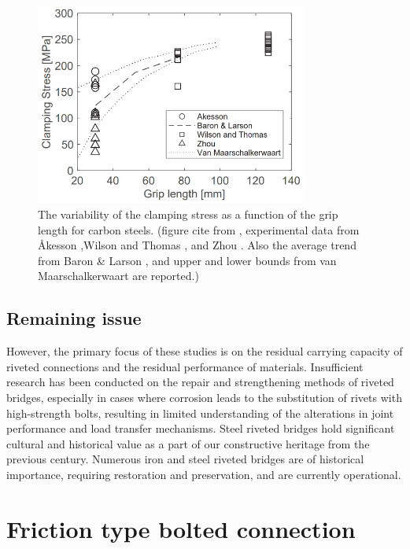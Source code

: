 \begin{figure}[htbp]
    \centering
    \includegraphics[width=0.8\textwidth]{imgs/ch2/preload-rivet.pdf}
    \caption[The variability of the clamping stress as a function of the grip length for carbon steels.]{The variability of the clamping stress as a function of the grip length for carbon steels. (figure cite from \cite{Leonetti2020RivetBridges}, experimental data from Åkesson \cite{Akesson2010},Wilson and Thomas \cite{Wilson1938FatigueJoints}, and Zhou \cite{Zhou1994FatigueMembers}. Also the average trend from Baron \& Larson \cite{Baron1953TheJoints}, and upper and lower bounds from van Maarschalkerwaart \cite{VanMaarschalkerwaart1982FatigueJoints} are reported.)}
    \label{fig-preload-rivet}
\end{figure}


\subsection{Remaining issue}
However, the primary focus of these studies is on the residual carrying capacity of riveted connections and the residual performance of materials. Insufficient research has been conducted on the repair and strengthening methods of riveted bridges, especially in cases where corrosion leads to the substitution of rivets with high-strength bolts, resulting in limited understanding of the alterations in joint performance and load transfer mechanisms. Steel riveted bridges hold significant cultural and historical value as a part of our constructive heritage from the previous century. Numerous iron and steel riveted bridges are of historical importance, requiring restoration and preservation, and are currently operational.

\section{Friction type bolted connection}

